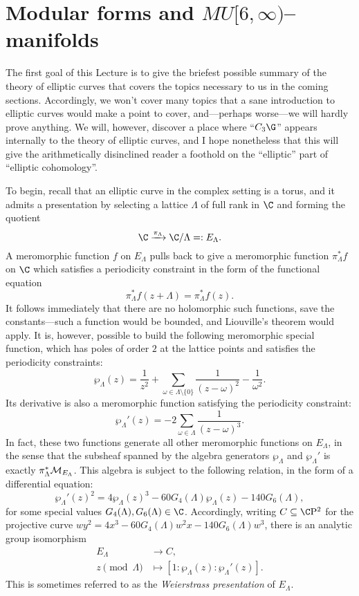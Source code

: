 









\section{Modular forms and \texorpdfstring{\(MU[6, \infty)\)}{MU[6, oo)}--manifolds}\label{SectionEllipticCurvesAndThetaFunctions}

The first goal of this Lecture is to give the briefest possible summary of the theory of elliptic curves that covers the topics necessary to us in the coming sections.  Accordingly, we won't cover many topics that a sane introduction to elliptic curves would make a point to cover, and---perhaps worse---we will hardly prove anything.  We will, however, discover a place where ``\(C_3 \G\)'' appears internally to the theory of elliptic curves, and I hope nonetheless that this will give the arithmetically disinclined reader a foothold on the ``elliptic'' part of ``elliptic cohomology''.

To begin, recall that an elliptic curve in the complex setting is a torus, and it admits a presentation by selecting a lattice \(\Lambda\) of full rank in \(\C\) and forming the quotient \[\C \xrightarrow{\pi_\Lambda} \C / \Lambda =: E_\Lambda.\]  A meromorphic function \(f\) on \(E_\Lambda\) pulls back to give a meromorphic function \(\pi_\Lambda^* f\) on \(\C\) which satisfies a periodicity constraint in the form of the functional equation \[\pi_\Lambda^* f(z + \Lambda) = \pi_\Lambda^* f(z).\]  It follows immediately that there are no holomorphic such functions, save the constants---such a function would be bounded, and Liouville's theorem would apply.  It is, however, possible to build the following meromorphic special function, which has poles of order \(2\) at the lattice points and satisfies the periodicity constraints: \[\wp_\Lambda(z) = \frac{1}{z^2} + \sum_{\omega \in \Lambda \setminus \{0\}} \frac{1}{(z - \omega)^2} - \frac{1}{\omega^2}.\]  Its derivative is also a meromorphic function satisfying the periodicity constraint: \[\wp_\Lambda'(z) = -2 \sum_{\omega \in \Lambda} \frac{1}{(z - \omega)^3}.\]  In fact, these two functions generate all other meromorphic functions on \(E_\Lambda\), in the sense that the subsheaf spanned by the algebra generators \(\wp_\Lambda\) and \(\wp_\Lambda'\) is exactly \(\pi_\Lambda^* \mathcal{M}_{E_\Lambda}\).  This algebra is subject to the following relation, in the form of a differential equation: \[\wp_\Lambda'(z)^2 = 4 \wp_\Lambda(z)^3 - 60G_4(\Lambda) \wp_\Lambda(z) - 140G_6(\Lambda),\] for some special values \(G_4(\Lambda), G_6(\Lambda) \in \C\).  Accordingly, writing \(C \subseteq \CP^2\) for the projective curve \(wy^2 = 4x^3 - 60 G_4(\Lambda) w^2 x - 140 G_6(\Lambda) w^3\), there is an analytic group isomorphism
\begin{align*}
E_\Lambda & \to C, \\
z \pmod \Lambda & \mapsto [1: \wp_\Lambda(z): \wp_\Lambda'(z)].
\end{align*}
This is sometimes referred to as the \textit{Weierstrass presentation} of \(E_\Lambda\).

